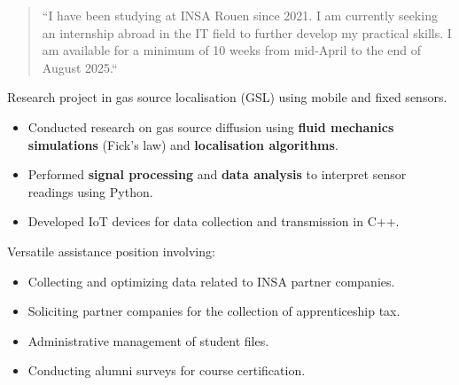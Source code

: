 \documentclass[10pt,a4paper,ragged2e,withhyper]{./AltaCV/altacv}
\begin{document}



\makecvheader



\begin{paracol}{2}

  \begin{quote}
    ``I have been studying at INSA Rouen since 2021.
    I am currently seeking an internship abroad in the IT field to further develop my practical skills.
    I am available for a minimum of 10 weeks from mid-April to the end of August 2025.``
  \end{quote}



  Research project in gas source localisation (GSL) using mobile and fixed sensors.
  
  \begin{itemize}
    \item Conducted research on gas source diffusion using \textbf{fluid mechanics simulations} (Fick's law) and \textbf{localisation algorithms}.
    \item Performed \textbf{signal processing} and \textbf{data analysis} to interpret sensor readings using Python.
    \item Developed IoT devices for data collection and transmission in C++.
  \end{itemize}

  \divider


  Versatile assistance position involving:
  \begin{itemize}
    \item Collecting and optimizing data related to INSA partner companies.
    \item Soliciting partner companies for the collection of apprenticeship tax.
    \item Administrative management of student files.
    \item Conducting alumni surveys for course certification.
  \end{itemize}


\end{paracol}
\end{document}
